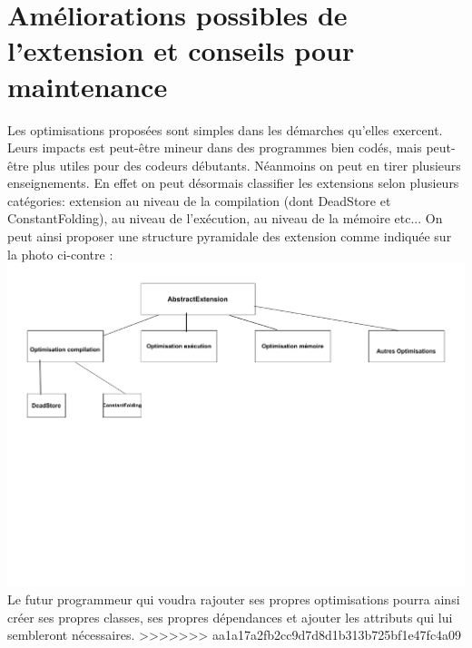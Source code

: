 \documentclass[a4paper]{article}
\begin{document}
\section{Améliorations possibles de l'extension et conseils pour maintenance}
Les optimisations proposées sont simples dans les démarches qu'elles exercent. Leurs impacts est peut-être mineur dans des programmes bien codés, mais peut-être plus utiles pour des codeurs débutants. Néanmoins on peut en tirer plusieurs enseignements.
En effet on peut désormais classifier les extensions selon plusieurs catégories: extension au niveau de la compilation (dont DeadStore et ConstantFolding), au niveau de l'exécution, au niveau de la mémoire etc...
On peut ainsi proposer une structure pyramidale des extension comme indiquée sur la photo ci-contre :\\
\includegraphics[scale=0.5]{UML.pdf}\\
Le futur programmeur qui voudra rajouter ses propres optimisations pourra ainsi créer ses propres classes, ses propres dépendances et ajouter les attributs qui lui sembleront nécessaires.
>>>>>>> aa1a17a2fb2cc9d7d8d1b313b725bf1e47fc4a09
\end{document}
